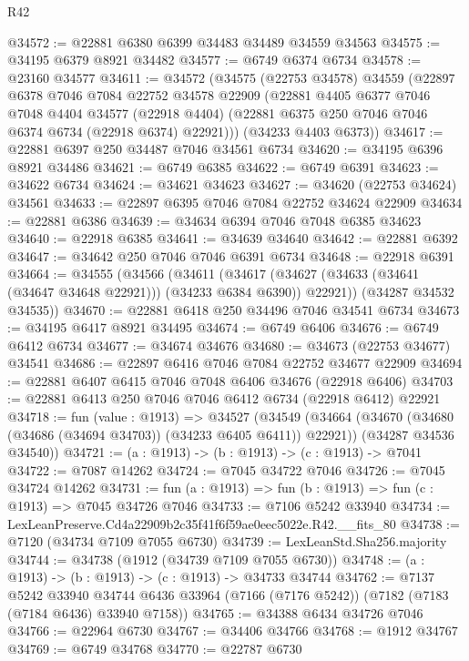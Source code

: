 \begin{lexlean}{R42}
\begin{coremodule}
{@34572 := @22881 @6380 @6399 @34483 @34489 @34559 @34563
@34575 := @34195 @6379 @8921 @34482
@34577 := @6749 @6374 @6734
@34578 := @23160 @34577
@34611 := @34572
    (@34575
      (@22753 @34578)
      @34559
      (@22897
        @6378
        @7046
        @7084
        @22752
        @34578
        @22909
        (@22881
          @4405
          @6377
          @7046
          @7048
          @4404
          @34577
          (@22918 @4404)
          (@22881 @6375 @250 @7046 @7046 @6374 @6734 (@22918 @6374) @22921)))
      (@34233 @4403 @6373))
@34617 := @22881 @6397 @250 @34487 @7046 @34561 @6734
@34620 := @34195 @6396 @8921 @34486
@34621 := @6749 @6385
@34622 := @6749 @6391
@34623 := @34622 @6734
@34624 := @34621 @34623
@34627 := @34620 (@22753 @34624) @34561
@34633 := @22897 @6395 @7046 @7084 @22752 @34624 @22909
@34634 := @22881 @6386
@34639 := @34634 @6394 @7046 @7048 @6385 @34623
@34640 := @22918 @6385
@34641 := @34639 @34640
@34642 := @22881 @6392
@34647 := @34642 @250 @7046 @7046 @6391 @6734
@34648 := @22918 @6391
@34664 := @34555
    (@34566
      (@34611
        (@34617 (@34627 (@34633 (@34641 (@34647 @34648 @22921))) (@34233 @6384 @6390)) @22921))
      (@34287 @34532 @34535))
@34670 := @22881 @6418 @250 @34496 @7046 @34541 @6734
@34673 := @34195 @6417 @8921 @34495
@34674 := @6749 @6406
@34676 := @6749 @6412 @6734
@34677 := @34674 @34676
@34680 := @34673 (@22753 @34677) @34541
@34686 := @22897 @6416 @7046 @7084 @22752 @34677 @22909
@34694 := @22881 @6407 @6415 @7046 @7048 @6406 @34676 (@22918 @6406)
@34703 := @22881 @6413 @250 @7046 @7046 @6412 @6734 (@22918 @6412) @22921
@34718 := fun (value : @1913) =>
  @34527
    (@34549
      (@34664 (@34670 (@34680 (@34686 (@34694 @34703)) (@34233 @6405 @6411)) @22921))
      (@34287 @34536 @34540))
@34721 := (a : @1913) -> (b : @1913) -> (c : @1913) -> @7041
@34722 := @7087 @14262
@34724 := @7045 @34722 @7046
@34726 := @7045 @34724 @14262
@34731 := fun (a : @1913) => fun (b : @1913) => fun (c : @1913) => @7045 @34726 @7046
@34733 := @7106 @5242 @33940
@34734 := LexLeanPreserve.Cd4a22909b2c35f41f6f59ae0eec5022e.R42.__fits_80
@34738 := @7120 (@34734 @7109 @7055 @6730)
@34739 := LexLeanStd.Sha256.majority
@34744 := @34738 (@1912 (@34739 @7109 @7055 @6730))
@34748 := (a : @1913) -> (b : @1913) -> (c : @1913) -> @34733 @34744
@34762 := @7137
    @5242
    @33940
    @34744
    @6436
    @33964
    (@7166 (@7176 @5242))
    (@7182 (@7183 (@7184 @6436) @33940 @7158))
@34765 := @34388 @6434 @34726 @7046
@34766 := @22964 @6730
@34767 := @34406 @34766
@34768 := @1912 @34767
@34769 := @6749 @34768
@34770 := @22787 @6730
}
\end{coremodule}
\end{lexlean}
